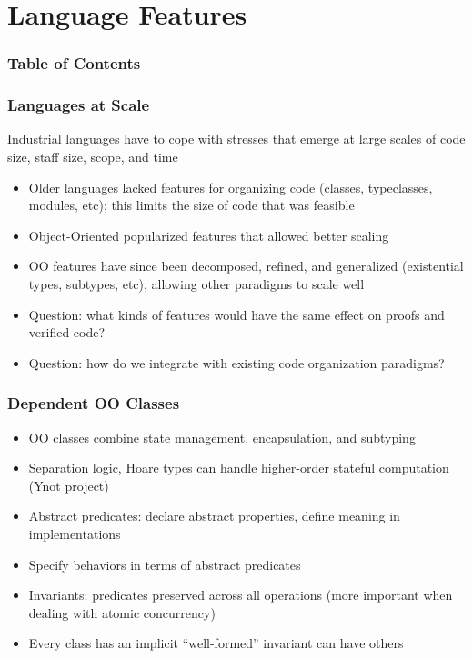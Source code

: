 \documentclass{beamer}
\begin{document}
\section{Language Features}

\begin{frame}
  \frametitle{Table of Contents}
  \tableofcontents[currentsection]
\end{frame}

\begin{frame}
  \frametitle{Languages at Scale}

  Industrial languages have to cope with stresses that emerge at large
  scales of code size, staff size, scope, and time
  \begin{itemize}
    \item Older languages lacked features for organizing code
      (classes, typeclasses, modules, etc); this limits the size of
      code that was feasible
    \item Object-Oriented popularized features that allowed better
      scaling
    \item OO features have since been decomposed, refined, and
      generalized (existential types, subtypes, etc), allowing other
      paradigms to scale well
    \item Question: what kinds of features would have the same effect
      on proofs and verified code?
    \item Question: how do we integrate with existing code
      organization paradigms?
  \end{itemize}
\end{frame}

\begin{frame}
  \frametitle{Dependent OO Classes}
  \begin{itemize}
    \item OO classes combine state management, encapsulation, and subtyping
    \item Separation logic, Hoare types can handle higher-order
      stateful computation (Ynot project)
    \item Abstract predicates: declare abstract properties, define
      meaning in implementations
    \item Specify behaviors in terms of abstract predicates
    \item Invariants: predicates preserved across all operations (more
      important when dealing with atomic concurrency)
    \item Every class has an implicit ``well-formed'' invariant can
      have others
  \end{itemize}
\end{frame}
\end{document}
